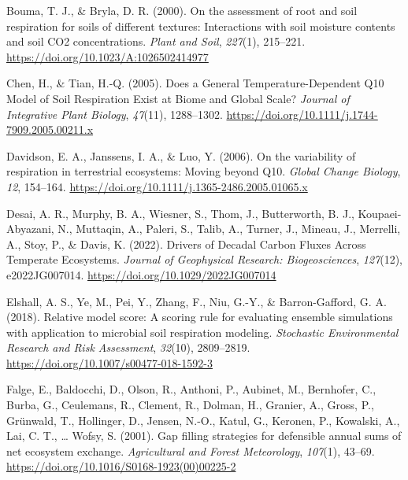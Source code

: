 \documentclass[
  letterpaper,
  DIV=11,
  numbers=noendperiod]{scrartcl}
\newlength{\cslhangindent}
\newenvironment{CSLReferences}[2] %
 {\begin{list}{}{%
  \setlength{\itemindent}{0pt}
  \setlength{\leftmargin}{0pt}
  \setlength{\parsep}{0pt}
  \ifodd #1
   \setlength{\leftmargin}{\cslhangindent}
   \setlength{\itemindent}{-1\cslhangindent}
  \fi
  \setlength{\itemsep}{#2\baselineskip}}}
 {\end{list}}
\begin{document}
\begin{CSLReferences}{1}{0}
Bouma, T. J., \& Bryla, D. R. (2000). On the assessment of root and soil
respiration for soils of different textures: Interactions with soil
moisture contents and soil {CO2} concentrations. \emph{Plant and Soil},
\emph{227}(1), 215--221. \url{https://doi.org/10.1023/A:1026502414977}

Chen, H., \& Tian, H.-Q. (2005). Does a {General Temperature-Dependent
Q10 Model} of {Soil Respiration Exist} at {Biome} and {Global Scale}?
\emph{Journal of Integrative Plant Biology}, \emph{47}(11), 1288--1302.
\url{https://doi.org/10.1111/j.1744-7909.2005.00211.x}

Davidson, E. A., Janssens, I. A., \& Luo, Y. (2006). On the variability
of respiration in terrestrial ecosystems: Moving beyond {Q10}.
\emph{Global Change Biology}, \emph{12}, 154--164.
\url{https://doi.org/10.1111/j.1365-2486.2005.01065.x}

Desai, A. R., Murphy, B. A., Wiesner, S., Thom, J., Butterworth, B. J.,
Koupaei-Abyazani, N., Muttaqin, A., Paleri, S., Talib, A., Turner, J.,
Mineau, J., Merrelli, A., Stoy, P., \& Davis, K. (2022). Drivers of
{Decadal Carbon Fluxes Across Temperate Ecosystems}. \emph{Journal of
Geophysical Research: Biogeosciences}, \emph{127}(12), e2022JG007014.
\url{https://doi.org/10.1029/2022JG007014}

Elshall, A. S., Ye, M., Pei, Y., Zhang, F., Niu, G.-Y., \&
Barron-Gafford, G. A. (2018). Relative model score: A scoring rule for
evaluating ensemble simulations with application to microbial soil
respiration modeling. \emph{Stochastic Environmental Research and Risk
Assessment}, \emph{32}(10), 2809--2819.
\url{https://doi.org/10.1007/s00477-018-1592-3}

Falge, E., Baldocchi, D., Olson, R., Anthoni, P., Aubinet, M.,
Bernhofer, C., Burba, G., Ceulemans, R., Clement, R., Dolman, H.,
Granier, A., Gross, P., Grünwald, T., Hollinger, D., Jensen, N.-O.,
Katul, G., Keronen, P., Kowalski, A., Lai, C. T., \ldots{} Wofsy, S.
(2001). Gap filling strategies for defensible annual sums of net
ecosystem exchange. \emph{Agricultural and Forest Meteorology},
\emph{107}(1), 43--69.
\url{https://doi.org/10.1016/S0168-1923(00)00225-2}


\end{CSLReferences}
\end{document}
